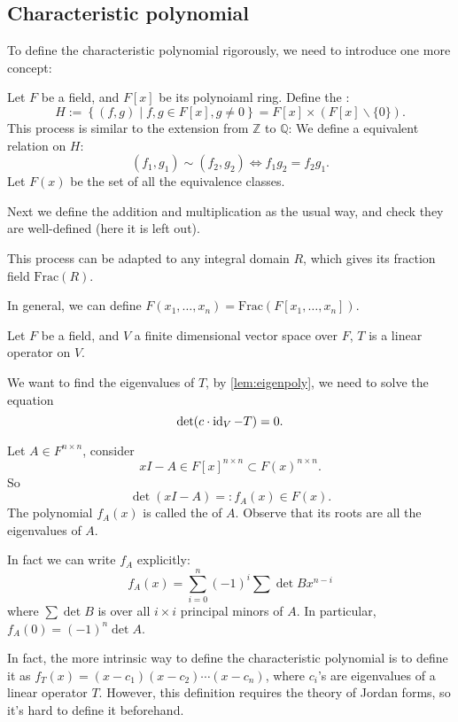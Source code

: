 \subsection{Characteristic polynomial}
\label{sub:Characteristic polynomial}

To define the characteristic polynomial rigorously,
we need to introduce one more concept:
\begin{definition}
	Let $F$ be a field, and $F[x]$ be its polynoiaml ring.
	Define the :
	\[
		H := \left\{(f,g)\mid f, g\in F[x], g\ne 0\right\}
		= F[x]\times (F[x]\backslash \{0\}).
	\]
	This process is similar to the extension from $\mathbb{Z}$ to $\mathbb{Q}$:
	We define a equivalent relation on $H$:
	\[
		(f_1,g_1)\sim(f_2,g_2)\iff f_1g_2=f_2g_1.
	\]
	Let $F(x)$ be the set of all the equivalence classes.

	Next we define the addition and multiplication as the usual way,
	and check they are well-defined (here it is left out).
\end{definition}
\begin{remark}
    This process can be adapted to any integral domain $R$,
	which gives its fraction field $\mathrm{Frac}(R)$.
\end{remark}

In general, we can define $F(x_1,\dots,x_n)= \mathrm{Frac}(F[x_1,\dots,x_n])$.

Let $F$ be a field, and $V$ a finite dimensional vector space over $F$,
$T$ is a linear operator on $V$.

We want to find the eigenvalues of $T$, by \autoref{lem:eigenpoly},
we need to solve the equation
 \[
\det(c\cdot \operatorname{id}_V - T) = 0.
\]
\begin{definition}
	Let $A\in F^{n \times n}$, consider
	\[
		xI-A\in F[x]^{n \times n} \subset F(x)^{n \times n}.
	\]
	So
	\[
	\det(xI-A) =: f_A(x)\in F(x).
	\]
	The polynomial $f_A(x)$ is called the  of $A$.
	Observe that its roots are all the eigenvalues of $A$.

	In fact we can write  $f_A$ explicitly:
	\[
	f_A(x) = \sum_{i=0}^{n} (-1)^i\sum \det B x^{n-i}
	\]
	where $\sum \det B$ is over all $i \times i$ principal minors of $A$.
	In particular, $f_A(0) = (-1)^n\det A$.
\end{definition}
\begin{remark}
    In fact, the more intrinsic way to define the characteristic polynomial
	is to define it as $f_T(x)=(x-c_1)(x-c_2)\cdots(x-c_n)$, where
	$c_i$'s are eigenvalues of a linear operator $T$.
	However, this definition requires the theory of Jordan forms,
	so it's hard to define it beforehand.
\end{remark}

